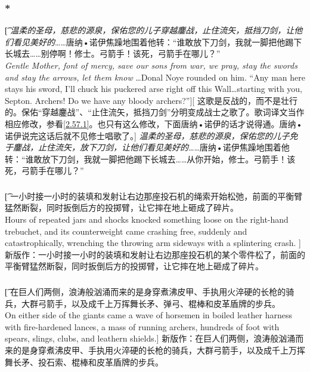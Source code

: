 \documentclass[12pt,a4paper]{article}
\begin{document}
\subsubsection{\color{red}*}\label{3.64.1}\t[
	 \emph{温柔的圣母，慈悲的源泉，保佑您的儿子穿越鏖战，止住流矢，抵挡刀剑，让他们看见美好的}……唐纳•诺伊焦躁地围着他转：“谁敢放下刀剑，我就一脚把他踢下长城去……别停啊！修士。弓箭手！该死，弓箭手在哪儿？”\\
	 \emph{Gentle Mother, font of mercy, save our sons from war, we pray, stay the swords and stay the arrows, let them know }\ldots Donal Noye rounded on him. “Any man here stays his sword, I'll chuck his puckered arse right off this Wall\ldots starting with you, Septon. Archers! Do we have any bloody archers?”][
	 这歌是反战的，而不是壮行的。保佑“穿越鏖战”、“止住流矢，抵挡刀剑”分明变成战士之歌了。歌词译文当作相应修改，参看\ref{2.57.1}。也只有这么修改，下面唐纳•诺伊的话才说得通。唐纳•诺伊说完这话后就不见修士唱歌了。]
	 \emph{温柔的圣母，慈悲的源泉，保佑您的儿子免于鏖战，止住流矢，放下刀剑，让他们看见美好的}……唐纳•诺伊焦躁地围着他转：“谁敢放下刀剑，我就一脚把他踢下长城去……从你开始，修士。弓箭手！该死，弓箭手在哪儿？”

\subsubsection{}\t[
	 一小时接一小时的装填和发射让右边那座投石机的绳索开始松弛，前面的平衡臂猛然断裂，同时扳倒后方的投掷臂，让它摔在地上砸成了碎片。\\
	 Hours of repeated jars and shocks knocked something loose on the right-hand trebuchet, and its counterweight came crashing free, suddenly and catastrophically, wrenching the throwing arm sideways with a splintering crash. ]
	 新版作：一小时接一小时的装填和发射让右边那座投石机的某个零件松了，前面的平衡臂猛然断裂，同时扳倒后方的投掷臂，让它摔在地上砸成了碎片。
	 
\subsubsection{}\t[
	在巨人们两侧，浪涛般汹涌而来的是身穿煮沸皮甲、手执用火淬硬的长枪的骑兵，大群弓箭手，以及成千上万挥舞长矛、弹弓、棍棒和皮革盾牌的步兵。\\
	On either side of the giants came a wave of horsemen in boiled leather harness with fire-hardened lances, a mass of running archers, hundreds of foot with spears, slings, clubs, and leathern shields.]
	新版作：在巨人们两侧，浪涛般汹涌而来的是身穿煮沸皮甲、手执用火淬硬的长枪的骑兵，大群弓箭手，以及成千上万挥舞长矛、投石索、棍棒和皮革盾牌的步兵。
	
\end{document}
